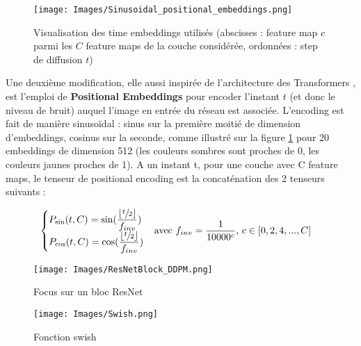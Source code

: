 \documentclass{article}
\begin{document}
\begin{minipage}{.40\textwidth}
    \vspace{-0.5cm}
    \begin{figure}[H]
        \centering
        \texttt{[image: Images/Sinusoidal\_positional\_embeddings.png]}
        \caption{Visualisation des time embeddings utilisés (abscisses : feature map $c$ parmi les $C$ feature maps de la couche considérée, ordonnées : step de diffusion $t$) \cite{time_embeddings}}
        \label{pos-enc}
    \end{figure}
\end{minipage}
\begin{minipage}{.02\textwidth}
    \text{\hfill}
\end{minipage}
\begin{minipage}{.58\textwidth}
    \setlength{\parindent}{1.5em}
    \begin{spacing}{1}
    Une deuxième modification, elle aussi inspirée de l'architecture des Transformers \cite{transformers}, est l'emploi de \textbf{Positional Embeddings} pour encoder l'instant $t$ (et donc le niveau de bruit) auquel l'image en entrée du réseau est associée. L'encoding est fait de manière sinusoïdal : sinus sur la première moitié de dimension d'embeddings, cosinus sur la seconde, comme illustré sur la figure \ref{pos-enc} pour 20 embeddings de dimension 512 (les couleurs sombres sont proches de 0, les couleurs jaunes proches de 1). A un instant t, pour une couche avec C feature maps, le tenseur de positional encoding est la concaténation des 2 tenseurs suivants :
    \end{spacing}
    \large
    \vspace{-0.5cm}
    \begin{align*}
        \begin{cases}
            P_{\sin}(t, C) = \sin(\dfrac{\left \lfloor{\sfrac{t}{2}}\right \rfloor}{f_{inv}}) \\
            P_{\cos}(t, C) = \cos(\dfrac{\left \lfloor{\sfrac{t}{2}}\right \rfloor}{f_{inv}}) \\
        \end{cases}
        &\text{\normalsize avec $f_{inv} = \frac{1}{10000^c}$, $c \in [0, 2, 4, ..., C]$}
    \end{align*}
\end{minipage}

\begin{minipage}{.5\textwidth}
    \begin{figure}[H]
        \centering
        \texttt{[image: Images/ResNetBlock\_DDPM.png]}
        \caption{Focus sur un bloc ResNet}
        \vspace{0.5cm}
    \end{figure}
\end{minipage}
\begin{minipage}{.01\textwidth}
    \text{\hfill}
\end{minipage}
\begin{minipage}{.5\textwidth}
\begin{figure}[H]
    \centering
    \texttt{[image: Images/Swish.png]}
    \caption{Fonction swish}
\end{figure}
\end{minipage}
\end{document}
